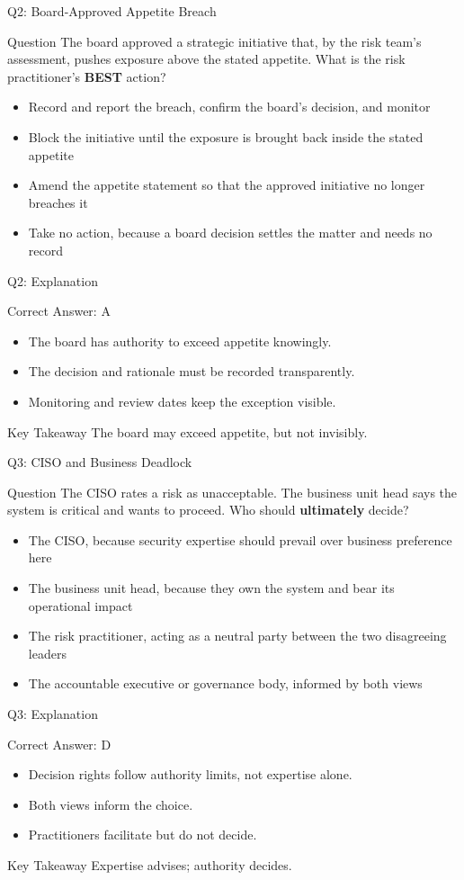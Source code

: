 \documentclass[aspectratio=169]{beamer}
\newcommand{\hq}[7]{%
	\begin{frame}{Q#1: #2}
		\begin{block}{Question}
			#3
		\end{block}
		\begin{itemize}
			#4
		\end{itemize}
	\end{frame}
	\begin{frame}{Q#1: Explanation}
		\begin{block}{Correct Answer: #5}
			\begin{itemize}
				#6
			\end{itemize}
		\end{block}
		\begin{alertblock}{Key Takeaway}
			#7
		\end{alertblock}
	\end{frame}
}
\begin{document}
	\hq{2}{Board-Approved Appetite Breach}
	{The board approved a strategic initiative that, by the risk team's assessment, pushes exposure above the stated appetite. What is the risk practitioner's \textbf{BEST} action?}
	{\item[\textbf{(A)}] Record and report the breach, confirm the board's decision, and monitor
		\item[\textbf{(B)}] Block the initiative until the exposure is brought back inside the stated appetite
		\item[\textbf{(C)}] Amend the appetite statement so that the approved initiative no longer breaches it
		\item[\textbf{(D)}] Take no action, because a board decision settles the matter and needs no record}
	{A}
	{\item The board has authority to exceed appetite knowingly.
		\item The decision and rationale must be recorded transparently.
		\item Monitoring and review dates keep the exception visible.}
	{The board may exceed appetite, but not invisibly.}

	\hq{3}{CISO and Business Deadlock}
	{The CISO rates a risk as unacceptable. The business unit head says the system is critical and wants to proceed. Who should \textbf{ultimately} decide?}
	{\item[\textbf{(A)}] The CISO, because security expertise should prevail over business preference here
		\item[\textbf{(B)}] The business unit head, because they own the system and bear its operational impact
		\item[\textbf{(C)}] The risk practitioner, acting as a neutral party between the two disagreeing leaders
		\item[\textbf{(D)}] The accountable executive or governance body, informed by both views}
	{D}
	{\item Decision rights follow authority limits, not expertise alone.
		\item Both views inform the choice.
		\item Practitioners facilitate but do not decide.}
	{Expertise advises; authority decides.}
\end{document}
